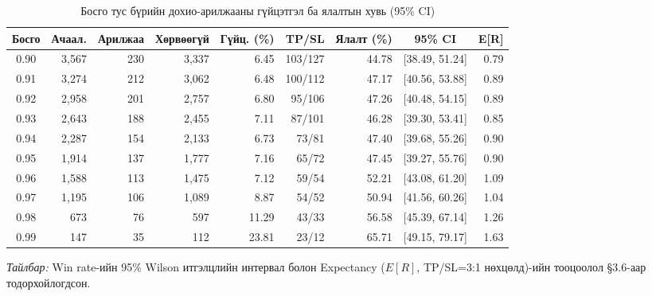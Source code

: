 \begin{table}[H]
\centering
\caption{Босго тус бүрийн дохио-арилжааны гүйцэтгэл ба ялалтын хувь (95\% CI)}
\label{tab:execution_conversion_ci}
\setlength{\tabcolsep}{2.5pt}
\renewcommand{\arraystretch}{1.10}
\scriptsize
\begin{tabular}{|c|r|r|r|r|r|r|c|r|}
\hline
\textbf{Босго} & \textbf{Ачаал.} & \textbf{Арилжаа} & \textbf{Хөрвөөгүй} & \textbf{Гүйц. (\%)} & \textbf{TP/SL} & \textbf{Ялалт (\%)} & \textbf{95\% CI} & \textbf{E[R]} \\ \hline
0.90 & 3{,}567 & 230 & 3{,}337 & 6.45 & 103/127 & 44.78 & [38.49, 51.24] & 0.79 \\ \hline
0.91 & 3{,}274 & 212 & 3{,}062 & 6.48 & 100/112 & 47.17 & [40.56, 53.88] & 0.89 \\ \hline
0.92 & 2{,}958 & 201 & 2{,}757 & 6.80 & 95/106 & 47.26 & [40.48, 54.15] & 0.89 \\ \hline
0.93 & 2{,}643 & 188 & 2{,}455 & 7.11 & 87/101 & 46.28 & [39.30, 53.41] & 0.85 \\ \hline
0.94 & 2{,}287 & 154 & 2{,}133 & 6.73 & 73/81 & 47.40 & [39.68, 55.26] & 0.90 \\ \hline
0.95 & 1{,}914 & 137 & 1{,}777 & 7.16 & 65/72 & 47.45 & [39.27, 55.76] & 0.90 \\ \hline
0.96 & 1{,}588 & 113 & 1{,}475 & 7.12 & 59/54 & 52.21 & [43.08, 61.20] & 1.09 \\ \hline
0.97 & 1{,}195 & 106 & 1{,}089 & 8.87 & 54/52 & 50.94 & [41.56, 60.26] & 1.04 \\ \hline
0.98 & 673 & 76 & 597 & 11.29 & 43/33 & 56.58 & [45.39, 67.14] & 1.26 \\ \hline
0.99 & 147 & 35 & 112 & 23.81 & 23/12 & 65.71 & [49.15, 79.17] & 1.63 \\ \hline
\end{tabular}
\end{table}

\noindent\textit{Тайлбар:} Win rate-ийн 95\% Wilson итгэлцлийн интервал болон Expectancy ($E[R]$, TP/SL=3:1 нөхцөлд)-ийн тооцоолол §3.6-аар тодорхойлогдсон.

